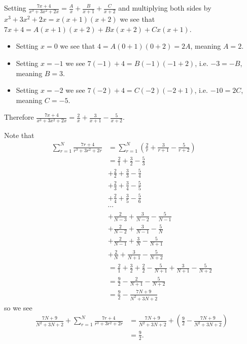 \begin{questions}
    \item \begin{partquestions}{\roman*}
        \item Setting $\frac{7x+4}{x^3+3x^2+2x} = \frac{A}{x} + \frac{B}{x+1} + \frac{C}{x+2}$ and multiplying both sides by $x^3+3x^2+2x = x(x+1)(x+2)$ we see that $7x+4 = A(x+1)(x+2) + Bx(x+2) + Cx(x+1)$.
        \begin{itemize}
            \item Setting $x = 0$ we see that $4 = A(0+1)(0+2) = 2A$, meaning $A = 2$.
            \item Setting $x = -1$ we see $7(-1) + 4 = B(-1)(-1+2)$, i.e. $-3 = -B$, meaning $B = 3$.
            \item Setting $x = -2$ we see $7(-2) + 4 = C(-2)(-2+1)$, i.e. $-10 = 2C$, meaning $C = -5$.
        \end{itemize}
        Therefore $\frac{7x+4}{x^3+3x^2+2x} = \frac{2}{x} + \frac{3}{x+1} - \frac{5}{x+2}$.

        \item Note that
        \begin{align*}
            \sum_{r=1}^N \frac{7r+4}{r^3+3r^2+2r} &= \sum_{r=1}^N \left(\frac{2}{r} + \frac{3}{r+1} - \frac{5}{r+2}\right)\\
            &= \frac21 + \frac32 - \frac53\\
            &+ \frac22 + \frac33 - \frac54\\
            &+ \frac23 + \frac34 - \frac55\\
            &+ \frac24 + \frac35 - \frac56\\
            &\cdots\\
            &+ \frac2{N-3} + \frac{3}{N-2} - \frac{5}{N-1}\\
            &+ \frac2{N-2} + \frac{3}{N-1} - \frac{5}{N}\\
            &+ \frac2{N-1} + \frac{3}{N} - \frac{5}{N+1}\\
            &+ \frac2{N} + \frac{3}{N+1} - \frac{5}{N+2}\\
            &= \frac21 + \frac32 + \frac22 - \frac{5}{N+1} + \frac{3}{N+1} - \frac{5}{N+2}\\
            &= \frac92 - \frac{2}{N+1} - \frac{5}{N+2}\\
            &= \frac92 - \frac{7N+9}{N^2+3N+2}
        \end{align*}
        so we see
        \begin{align*}
            \frac{7N+9}{N^2+3N+2} + \sum_{r=1}^N \frac{7r+4}{r^3+3r^2+2r} &= \frac{7N+9}{N^2+3N+2} + \left(\frac92 - \frac{7N+9}{N^2+3N+2}\right)\\
            &= \frac92.
        \end{align*}
    \end{partquestions}


\end{questions}
